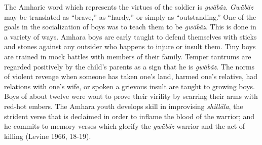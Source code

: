 The Amharic word which represents the virtues of the soldier is \emph{gw\"{a}b\"{a}z}. \emph{Gw\"{a}b\"{a}z} may be translated as ``brave,'' as ``hardy,'' or simply as ``outstanding.'' One of the goals in the socialization of boys was to teach them to be \emph{gw\"{a}b\"{a}z}. This is done in a variety of ways. Amhara boys are early taught to defend themselves with sticks and stones against any outsider who happens to injure or insult them. Tiny boys are trained in mock battles with members of their family. Temper tantrums are regarded positively by the child's parents as a sign that he is \emph{gw\"{a}b\"{a}z}. The norms of violent revenge when someone has taken one's land, harmed one's relative, had relations with one's wife, or spoken a grievous insult are taught to growing boys. Boys of about twelve were wont to prove their virility by scarring their arms with red-hot embers. The Amhara youth develops skill in improvising \emph{shill\"{a}la}, the strident verse that is declaimed in order to inflame the blood of the warrior; and he commits to memory verses which glorify the \emph{gw\"{a}b\"{a}z} warrior and the act of killing (Levine 1966, 18-19).


